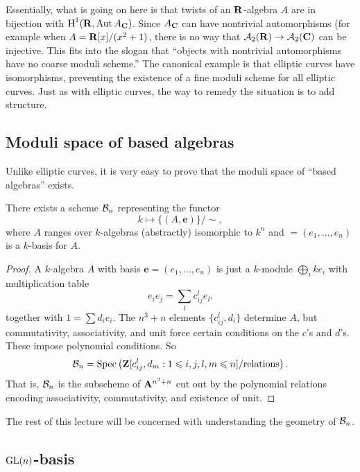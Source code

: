 Essentially, what is going on here is that twists of an $\mathbf{R}$-algebra 
$A$ are in bijection with $\operatorname{H}^1(\mathbf{R},\operatorname{Aut} A_{\mathbf{C}})$. Since $A_{\mathbf{C}}$ can 
have nontrivial automorphisms (for example when $A=\mathbf{R}[x]/(x^2+1)$, there is 
no way that $\mathcal{A}_2(\mathbf{R})\to \mathcal{A}_2(\mathbf{C})$ can be injective. This fits into the 
slogan that ``objects with nontrivial automorphisms have no coarse moduli 
scheme.'' The canonical example is that 
elliptic curves have isomorphisms, preventing the existence of a fine moduli 
scheme for all elliptic curves. Just as with elliptic curves, the way to remedy 
the situation is to add structure. 





\subsection{Moduli space of based algebras}

Unlike elliptic curves, it is very easy to prove that the moduli space of 
``based algebras'' exists. 

\begin{theo}
There exists a scheme $\mathcal{B}_n$ representing the functor 
\[
  k\mapsto \{(A,\boldsymbol e)\}/\sim ,
\]
where $A$ ranges over $k$-algebras (abstractly) isomorphic to $k^n$ and 
$\boldsymbol=(e_1,\dots,e_n)$ is a $k$-basis for $A$. 
\end{theo}
\begin{proof}
A $k$-algebra $A$ with basis $\boldsymbol e=(e_1,\dots,e_n)$ is just a 
$k$-module $\bigoplus_i k e_i$ with multiplication table 
\[
  e_i e_j = \sum_l c_{i j}^l e_l .
\]
together with $1=\sum d_i e_i$. The $n^3+n$ elements 
$\{c_{i j}^l,d_i\}$ determine $A$, but commutativity, associativity, and unit 
force certain conditions on the $c$'s and $d$'s. These impose polynomial 
conditions. So 
\[
  \mathcal{B}_n = \operatorname{Spec}\left(\mathbf{Z}[c_{i j}^l,d_m:1\leqslant i,j,l,m\leqslant n] / \text{relations}\right) .
\]
That is, $\mathcal{B}_n$ is the subscheme of $\mathbf{A}^{n^3+n}$ cut out by the polynomial 
relations encoding associativity, commutativity, and existence of unit. 
\end{proof}

The rest of this lecture will be concerned with understanding the geometry of 
$\mathcal{B}_n$. 





\subsection{\texorpdfstring{$\operatorname{GL}(n)$}{GL(n)}-basis}

